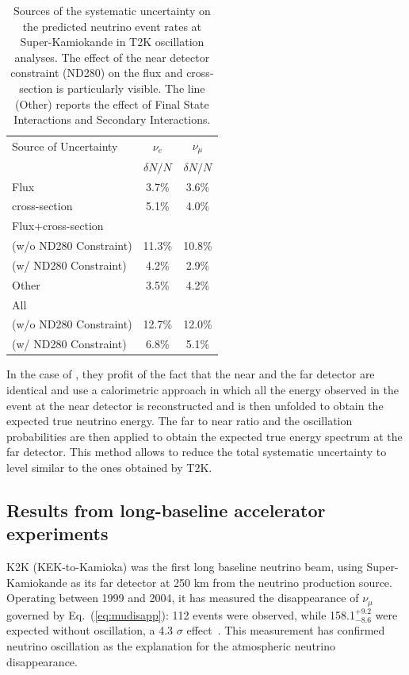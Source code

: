\begin{table}[htb]
\begin{center}
\caption{Sources of the systematic uncertainty on the predicted neutrino event rates at Super-Kamiokande in T2K oscillation analyses.
The effect of the near detector constraint (ND280) on the flux and cross-section is particularly visible. The line (Other) reports the effect of Final State Interactions and Secondary Interactions.
}
\begin{tabular}{|l|c|c| } \hline 
Source of Uncertainty& $\nu_e$ & $\nu_{\mu}$ \\ 
 &$\delta N/N$&$\delta N/N$\\ \hline
Flux&3.7\%& 3.6\% \\ \hline
cross-section &5.1\%& 4.0\% \\ \hline
Flux+cross-section&& \\
(w/o ND280 Constraint)&11.3\% &10.8\% \\
(w/ ND280 Constraint)&4.2\% &2.9\% \\ \hline
Other & 3.5\%& 4.2\% \\ \hline
All & & \\
(w/o ND280 Constraint)& 12.7\%& 12.0\% \\ 
(w/ ND280 Constraint)& 6.8\%& 5.1\% \\ \hline 
\end{tabular}
\label{tab:t2ksyst}
\end{center}
\end{table}


In the case of \nova, they profit of the fact that the near and the far detector are identical and use a calorimetric approach in which all the energy observed in the event at the near detector is reconstructed and is then unfolded to obtain the expected true neutrino energy. The far to near ratio and the oscillation probabilities are then applied to obtain the expected true energy spectrum at the far detector. This method allows to reduce the total systematic uncertainty to level similar to the ones obtained by T2K.

\subsection{Results from long-baseline accelerator experiments}

K2K (KEK-to-Kamioka) was the first long baseline neutrino beam, using Super-Kamiokande as its far detector at 250 km from the neutrino production source. Operating between 1999 and 2004, it has measured the disappearance of $\nu_\mu$ governed by Eq.~(\ref{eq:mudisapp}): 112 events were observed, while 158.1$^{+9.2}_{-8.6}$ were expected without oscillation, a 4.3 $\sigma$ effect~\cite{Ahn:2006zza}. This measurement has confirmed neutrino oscillation as the explanation for the atmospheric neutrino disappearance. 

